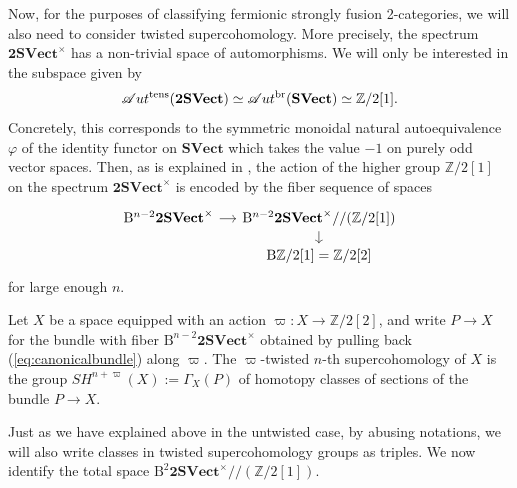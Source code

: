\documentclass[10pt,a4paper]{amsart}
\numberwithin{equation}{section}
\begin{document}
Now, for the purposes of classifying fermionic strongly fusion 2-categories, we will also need to consider twisted supercohomology. More precisely, the spectrum $\mathbf{2SVect}^{\times}$ has a non-trivial space of automorphisms. We will only be interested in the subspace given by
\begin{gather*}
\mathscr{A}ut^{\rm tens}(\mathbf{2SVect}) \simeq \mathscr{A}ut^{\operatorname{br}}(\mathbf{SVect})\simeq \mathbb{Z}/2[1].
\end{gather*}
 Concretely, this corresponds to the symmetric monoidal natural autoequivalence $\varphi$ of the identity functor on $\mathbf{SVect}$ which takes the value $-1$ on purely odd vector spaces. Then, as is explained in \cite[Section~4.1]{NSS}, the action of the higher group $\mathbb{Z}/2[1]$ on the spectrum $\mathbf{2SVect}^{\times}$ is encoded by the fiber sequence of spaces
 \begin{equation}\begin{tikzcd}[sep=small]
\mathrm{B}^{n-2}\mathbf{2SVect}^{\times} \arrow[r] & {\mathrm{B}^{n-2}\mathbf{2SVect}^{\times}//(\mathbb{Z}/2[1])} \arrow[d] \\
&{\mathrm{B}\mathbb{Z}/2[1]=\mathbb{Z}/2[2]}\label{eq:canonicalbundle}
\end{tikzcd}\end{equation}
 for large enough $n$.

\begin{Definition}\label{def:twistedSH}
Let $X$ be a space equipped with an action $\varpi\colon X\rightarrow \mathbb{Z}/2[2]$, and write $P\rightarrow X$ for the bundle with fiber $\mathrm{B}^{n-2}\mathbf{2SVect}^{\times}$ obtained by pulling back (\ref{eq:canonicalbundle}) along $\varpi$. The $\varpi$-twisted $n$-th supercohomology of $X$ is the group $SH^{n+\varpi}(X):=\Gamma_X(P)$ of homotopy classes of sections of the bundle $P\rightarrow X$.
\end{Definition}

Just as we have explained above in the untwisted case, by abusing notations, we will also write classes in twisted supercohomology groups as triples.
We now identify the total space $\mathrm{B}^2\mathbf{2SVect}^{\times}\allowbreak//(\mathbb{Z}/ 2[1])$.
\end{document}
